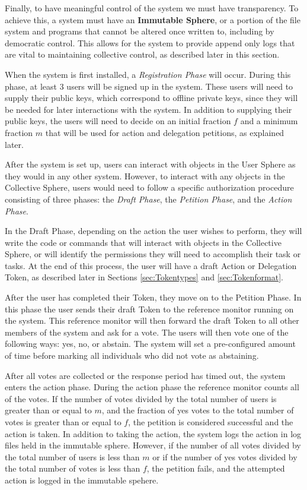 Finally, to have meaningful control of the system we must have transparency. To
achieve this, a system must have an \textbf{Immutable Sphere}, or a portion of
the file system and programs that cannot be altered once written to, including
by democratic control. This allows for the system to provide append only logs
that are vital to maintaining collective control, as described later in this
section.

When the system is first installed, a \textit{Registration Phase} will occur.
During this phase, at least 3 users will be signed up in the system. These users
will need to supply their public keys, which correspond to offline private keys,
since they will be needed for later interactions with the system. In addition to
supplying their public keys, the users will need to decide on an initial
fraction $f$ and a minimum fraction $m$ that will be used for action and
delegation petitions, as explained later.

After the system is set up, users can interact with objects in the User Sphere
as they would in any other system. However, to interact with any objects in the
Collective Sphere, users would need to follow a specific authorization
procedure consisting of three phases: the \textit{Draft Phase}, the 
\textit{Petition Phase}, and the \textit{Action Phase}.

In the Draft Phase, depending on the action the user wishes to perform, they
will write the code or commands that will interact with objects in the
Collective Sphere, or will identify the permissions they will need to accomplish
their task or tasks. At the end of this process, the user will have a draft
Action or Delegation Token, as described later in Sections \ref{sec:Tokentypes}
and \ref{sec:Tokenformat}.

After the user has completed their Token, they move on to the Petition Phase. In
this phase the user sends their draft Token to the reference monitor running on
the system. This reference monitor will then forward the draft Token to all
other members of the system and ask for a vote. The users will then vote one of
the following ways: yes, no, or abstain. The system will set a pre-configured
amount of time before marking all individuals who did not vote as abstaining.

After all votes are collected or the response period has timed out, the system
enters the action phase. During the action phase the reference monitor counts
all of the votes. If the number of votes divided by the total number of users is
greater than or equal to $m$, and the fraction of yes votes to the total number
of votes is greater than or equal to $f$, the petition is considered successful
and the action is taken. In addition to taking the action, the system logs the
action in log files held in the immutable sphere. However, if the number of all
votes divided by the total number of users is less than $m$ or if the number of
yes votes divided by the total number of votes is less than $f$, the petition
fails, and the attempted action is logged in the immutable spehere.

